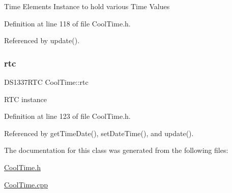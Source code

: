 Time Elements Instance to hold various Time Values 

Definition at line 118 of file Cool\+Time.\+h.



Referenced by update().

\mbox{\label{class_cool_time_abd38f2384ff90692b1568d9db869412e}} 
\subsubsection{\texorpdfstring{rtc}{rtc}}
{\footnotesize\ttfamily D\+S1337\+R\+TC Cool\+Time\+::rtc\hspace{0.3cm}{\ttfamily [private]}}

R\+TC instance 

Definition at line 123 of file Cool\+Time.\+h.



Referenced by get\+Time\+Date(), set\+Date\+Time(), and update().



The documentation for this class was generated from the following files\+:\begin{DoxyCompactItemize}
\item 
\hyperlink{_cool_time_8h}{Cool\+Time.\+h}\item 
\hyperlink{_cool_time_8cpp}{Cool\+Time.\+cpp}\end{DoxyCompactItemize}
